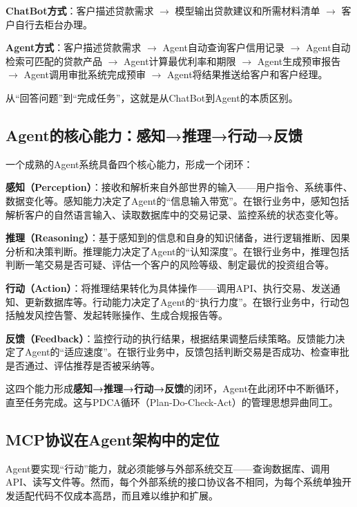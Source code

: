 \begin{casebox}
\textbf{ChatBot方式}：客户描述贷款需求 $\rightarrow$ 模型输出贷款建议和所需材料清单 $\rightarrow$ 客户自行去柜台办理。

\textbf{Agent方式}：客户描述贷款需求 $\rightarrow$ Agent自动查询客户信用记录 $\rightarrow$ Agent自动检索可匹配的贷款产品 $\rightarrow$ Agent计算最优利率和期限 $\rightarrow$ Agent生成预审报告 $\rightarrow$ Agent调用审批系统完成预审 $\rightarrow$ Agent将结果推送给客户和客户经理。

从``回答问题''到``完成任务''，这就是从ChatBot到Agent的本质区别。
\end{casebox}

\subsection{Agent的核心能力：感知→推理→行动→反馈}

一个成熟的Agent系统具备四个核心能力，形成一个闭环：

\textbf{感知（Perception）}：接收和解析来自外部世界的输入——用户指令、系统事件、数据变化等。感知能力决定了Agent的``信息输入带宽''。在银行业务中，感知包括解析客户的自然语言输入、读取数据库中的交易记录、监控系统的状态变化等。

\textbf{推理（Reasoning）}：基于感知到的信息和自身的知识储备，进行逻辑推断、因果分析和决策判断。推理能力决定了Agent的``认知深度''。在银行业务中，推理包括判断一笔交易是否可疑、评估一个客户的风险等级、制定最优的投资组合等。

\textbf{行动（Action）}：将推理结果转化为具体操作——调用API、执行交易、发送通知、更新数据库等。行动能力决定了Agent的``执行力度''。在银行业务中，行动包括触发风控告警、发起转账操作、生成合规报告等。

\textbf{反馈（Feedback）}：监控行动的执行结果，根据结果调整后续策略。反馈能力决定了Agent的``适应速度''。在银行业务中，反馈包括判断交易是否成功、检查审批是否通过、评估推荐是否被采纳等。

这四个能力形成\textbf{感知→推理→行动→反馈}的闭环，Agent在此闭环中不断循环，直至任务完成。这与PDCA循环（Plan-Do-Check-Act）的管理思想异曲同工。

\subsection{MCP协议在Agent架构中的定位}

Agent要实现``行动''能力，就必须能够与外部系统交互——查询数据库、调用API、读写文件等。然而，每个外部系统的接口协议各不相同，为每个系统单独开发适配代码不仅成本高昂，而且难以维护和扩展。

